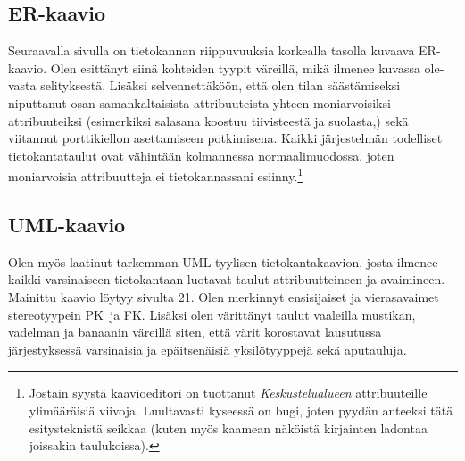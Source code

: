 \documentclass[11pt]{article}
\begin{document}
		\subsection{ER-kaavio}
			Seuraavalla sivulla on tietokannan riippuvuuksia korkealla tasolla kuvaava ER-kaavio. Olen
			esittänyt siinä kohteiden tyypit väreillä, mikä ilmenee kuvassa ole-vasta selityksestä. Lisäksi
			selvennettäköön, että olen tilan säästämiseksi niputtanut osan samankaltaisista attribuuteista 
			yhteen moniarvoisiksi attribuuteiksi (esimerkiksi salasana koostuu tiivisteestä ja suolasta,) sekä
			viitannut porttikiellon asettamiseen potkimisena. Kaikki järjestelmän todelliset tietokantataulut
			ovat vähintään kolmannessa normaalimuodossa, joten moniarvoisia attribuutteja ei tietokannassani
			esiinny.\footnote{Jostain syystä kaavioeditori on tuottanut \emph{Keskustelualueen}
			attribuuteille ylimääräisiä viivoja. Luultavasti kyseessä on bugi, joten pyydän anteeksi tätä
			esitysteknistä seikkaa (kuten myös kaamean näköistä kirjainten ladontaa joissakin taulukoissa).}
		
		\subsection{UML-kaavio}
			Olen myös laatinut tarkemman UML-tyylisen tietokantakaavion, josta ilmenee kaikki
			varsinaiseen tietokantaan luotavat taulut attribuutteineen ja avaimineen. Mainittu kaavio löytyy
			sivulta 21. Olen merkinnyt ensisijaiset ja vierasavaimet stereotyypein \flqq PK\frqq \ ja \flqq 
			FK\frqq. Lisäksi olen värittänyt taulut vaaleilla mustikan, vadelman ja banaanin väreillä siten,
			että värit korostavat lausutussa järjestyksessä varsinaisia ja epäitsenäisiä yksilötyyppejä sekä
			aputauluja.
		
\end{document}
